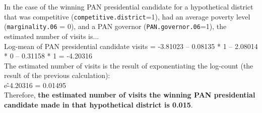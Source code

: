 \documentclass[12pt,letterpaper]{article}
\begin{document}
In the case of the winning PAN presidential candidate for a hypothetical district that was competitive (\texttt{competitive.district}=1), had an average poverty level (\texttt{marginality.06} = 0), and a PAN governor (\texttt{PAN.governor.06}=1), the estimated number of visits is...\\

Log-mean of PAN presidential candidate visits = -3.81023 -- 0.08135 * 1 -- 2.08014 * 0 -- 0.31158 * 1 = -4.20316\\

The estimated number of visits is the result of exponentiating the log-count (the result of the previous calculation):\\

e\^-4.20316 = 0.01495\\

Therefore, \textbf{the estimated number of visits the winning PAN presidential candidate made in that hypothetical district is 0.015}.
\end{document}
